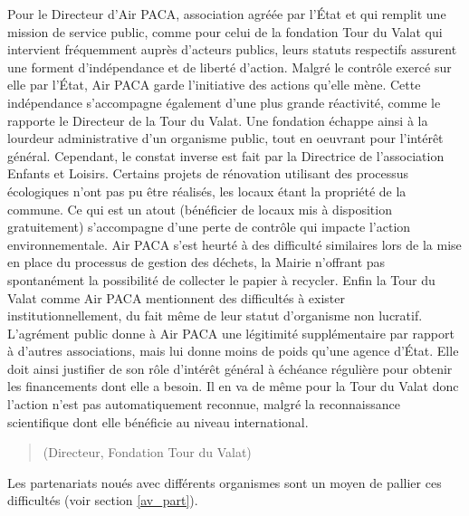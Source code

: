         Pour le Directeur d'Air PACA, association agréée par l'État et qui remplit une mission de service public, comme pour celui de la fondation Tour du Valat qui intervient fréquemment auprès d'acteurs publics, leurs statuts respectifs assurent une forment d'indépendance et de liberté d'action. Malgré le contrôle exercé sur elle par l'État, Air PACA garde l'initiative des actions qu'elle mène. Cette indépendance s'accompagne également d'une plus grande réactivité, comme le rapporte le Directeur de la Tour du Valat. Une fondation échappe ainsi à la lourdeur administrative d'un organisme public, tout en oeuvrant pour l'intérêt général. Cependant, le constat inverse est fait par la Directrice de l'association Enfants et Loisirs. Certains projets de rénovation utilisant des processus écologiques n'ont pas pu être réalisés, les locaux étant la propriété de la commune. Ce qui est un atout (bénéficier de locaux mis à disposition gratuitement) s'accompagne d'une perte de contrôle qui impacte l'action environnementale. Air PACA s'est heurté à des difficulté similaires lors de la mise en place du processus de gestion des déchets, la Mairie n'offrant pas spontanément la possibilité de collecter le papier à recycler. Enfin la Tour du Valat comme Air PACA mentionnent des difficultés à exister institutionnellement, du fait même de leur statut d'organisme non lucratif. L'agrément public donne à Air PACA une légitimité supplémentaire par rapport à d'autres associations, mais lui donne moins de poids qu'une agence d'État. Elle doit ainsi justifier de son rôle d'intérêt général à échéance régulière pour obtenir les financements dont elle a besoin. Il en va de même pour la Tour du Valat donc l'action n'est pas automatiquement reconnue, malgré la reconnaissance scientifique dont elle bénéficie au niveau international.
        \begin{quotation}
             (Directeur, Fondation Tour du Valat)
        \end{quotation}
        Les partenariats noués avec différents organismes sont un moyen de pallier ces difficultés (voir section \ref{av_part}).

